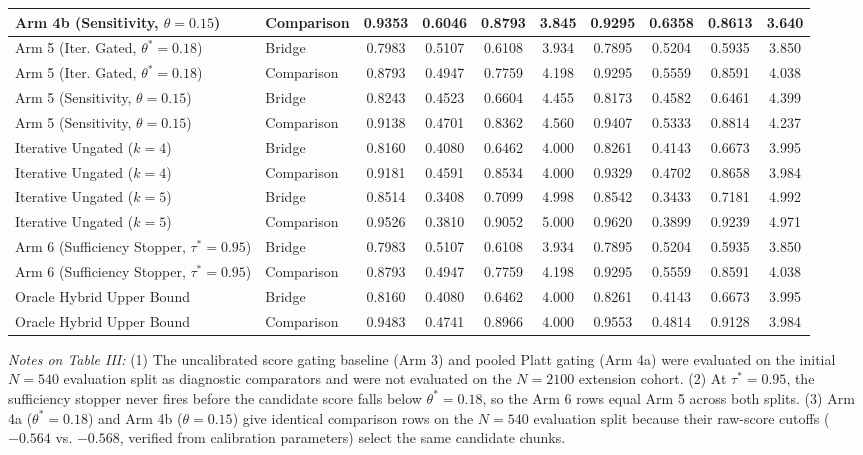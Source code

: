 \documentclass{article}
\begin{document}
\begin{table}[t]
{\begin{tabular}{|l|l|c|c|c|c|c|c|c|c|}
\hline
Arm 4b (Sensitivity, $\theta=0.15$) & Comparison & 0.9353 & 0.6046 & 0.8793 & 3.845 & 0.9295 & 0.6358 & 0.8613 & 3.640 \\
\hline
Arm 5 (Iter. Gated, $\theta^*=0.18$) & Bridge & 0.7983 & 0.5107 & 0.6108 & 3.934 & 0.7895 & 0.5204 & 0.5935 & 3.850 \\
\hline
Arm 5 (Iter. Gated, $\theta^*=0.18$) & Comparison & 0.8793 & 0.4947 & 0.7759 & 4.198 & 0.9295 & 0.5559 & 0.8591 & 4.038 \\
\hline
Arm 5 (Sensitivity, $\theta=0.15$) & Bridge & 0.8243 & 0.4523 & 0.6604 & 4.455 & 0.8173 & 0.4582 & 0.6461 & 4.399 \\
\hline
Arm 5 (Sensitivity, $\theta=0.15$) & Comparison & 0.9138 & 0.4701 & 0.8362 & 4.560 & 0.9407 & 0.5333 & 0.8814 & 4.237 \\
\hline
Iterative Ungated ($k=4$) & Bridge & 0.8160 & 0.4080 & 0.6462 & 4.000 & 0.8261 & 0.4143 & 0.6673 & 3.995 \\
\hline
Iterative Ungated ($k=4$) & Comparison & 0.9181 & 0.4591 & 0.8534 & 4.000 & 0.9329 & 0.4702 & 0.8658 & 3.984 \\
\hline
Iterative Ungated ($k=5$) & Bridge & 0.8514 & 0.3408 & 0.7099 & 4.998 & 0.8542 & 0.3433 & 0.7181 & 4.992 \\
\hline
Iterative Ungated ($k=5$) & Comparison & 0.9526 & 0.3810 & 0.9052 & 5.000 & 0.9620 & 0.3899 & 0.9239 & 4.971 \\
\hline
Arm 6 (Sufficiency Stopper, $\tau^*=0.95$) & Bridge & 0.7983 & 0.5107 & 0.6108 & 3.934 & 0.7895 & 0.5204 & 0.5935 & 3.850 \\
\hline
Arm 6 (Sufficiency Stopper, $\tau^*=0.95$) & Comparison & 0.8793 & 0.4947 & 0.7759 & 4.198 & 0.9295 & 0.5559 & 0.8591 & 4.038 \\
\hline
Oracle Hybrid Upper Bound & Bridge & 0.8160 & 0.4080 & 0.6462 & 4.000 & 0.8261 & 0.4143 & 0.6673 & 3.995 \\
\hline
Oracle Hybrid Upper Bound & Comparison & 0.9483 & 0.4741 & 0.8966 & 4.000 & 0.9553 & 0.4814 & 0.9128 & 3.984 \\
\hline
\end{tabular}%
}
\vspace{1ex}
\begin{flushleft}
\footnotesize \textit{Notes on Table III:} (1) The uncalibrated score gating baseline (Arm 3) and pooled Platt gating (Arm 4a) were evaluated on the initial $N=540$ evaluation split as diagnostic comparators and were not evaluated on the $N=2100$ extension cohort. (2) At $\tau^*=0.95$, the sufficiency stopper never fires before the candidate score falls below $\theta^*=0.18$, so the Arm 6 rows equal Arm 5 across both splits. (3) Arm 4a ($\theta^*=0.18$) and Arm 4b ($\theta=0.15$) give identical comparison rows on the $N=540$ evaluation split because their raw-score cutoffs ($-0.564$ vs. $-0.568$, verified from calibration parameters) select the same candidate chunks.
\end{flushleft}
\end{table}
\end{document}
